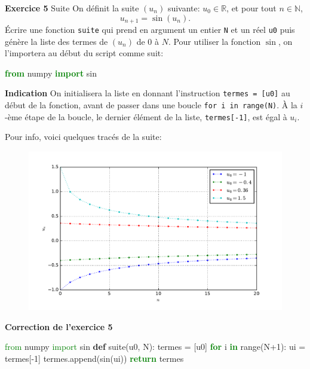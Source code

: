 \documentclass[10pt]{beamer}
\begin{document}
\begin{frame}[fragile]
\begin{block}{\textbf{Exercice 5} Suite}
On définit la suite $(u_n)$ suivante: $u_0\in\mathbb{R}$, et pour tout $n\in\mathbb{N}$, \[u_{n+1} = \sin(u_n).\]
\pause
Écrire une fonction \verb|suite| qui prend en argument un entier \verb|N| et un réel \verb|u0| puis génère la liste des termes de $(u_n)$ de $0$ à $N$.
\pause
Pour utiliser la fonction $\sin$, on l'importera au début du script comme suit:
\begin{semiverbatim}
\textcolor{green}{\textbf{from}} numpy \textcolor{green}{\textbf{import}} sin
\end{semiverbatim}
\pause

\textbf{Indication} On initialisera la liste en donnant l'instruction \verb|termes = [u0]| au début de la fonction, avant de passer dans une boucle \verb|for i in range(N)|. À la  $i$-ème étape de la boucle, le dernier élément de la liste, \verb|termes[-1]|, est égal à $u_i$.

\end{block}
\end{frame}

\begin{frame}
Pour info, voici quelques tracés de la suite:
\begin{figure}
\centering
\includegraphics[width=\textwidth]{chope.pdf}
\end{figure}
\end{frame}

\begin{frame}[fragile]
\begin{block}{\textbf{Correction de l'exercice 5}}
\begin{semiverbatim}\textcolor{green}{from} numpy \textcolor{green}{import} sin
\textbf{def} suite(u0, N):
    termes = [u0]
    \textcolor{green}{\textbf{for}} i \textcolor{green}{\textbf{in}} range(N+1):
        ui = termes[-1]
        termes.append(sin(ui))
    \textcolor{green}{\textbf{return}} termes\end{semiverbatim}
\end{block}
\end{frame}
\end{document}
